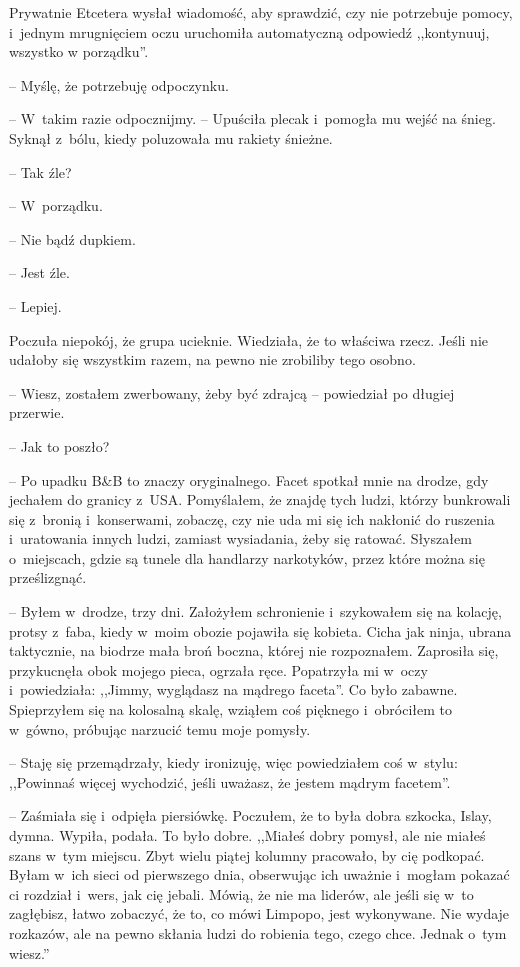 \documentclass[oneside,polish,11pt,sfheadings]{mwbk}
\begin{document}
Prywatnie Etcetera wysłał
wiadomość, aby sprawdzić, czy nie potrzebuje pomocy, i~jednym
mrugnięciem oczu uruchomiła automatyczną odpowiedź ,,kontynuuj, wszystko
w porządku''.

-- Myślę, że potrzebuję odpoczynku.

-- W~takim razie odpocznijmy. -- Upuściła plecak i~pomogła mu wejść na
śnieg. Syknął z~bólu, kiedy poluzowała mu rakiety śnieżne.

-- Tak źle?

-- W~porządku.

-- Nie bądź dupkiem.

-- Jest źle.

-- Lepiej.

Poczuła niepokój, że grupa ucieknie. Wiedziała, że to właściwa rzecz.
Jeśli nie udałoby się wszystkim razem, na pewno nie zrobiliby tego
osobno.

-- Wiesz, zostałem zwerbowany, żeby być zdrajcą -- powiedział po długiej
przerwie.

-- Jak to poszło?

-- Po upadku B\&B to znaczy oryginalnego. Facet spotkał mnie na drodze,
gdy jechałem do granicy z~USA. Pomyślałem, że znajdę tych ludzi, którzy
bunkrowali się z~bronią i~konserwami, zobaczę, czy nie uda mi się ich
nakłonić do ruszenia i~uratowania innych ludzi, zamiast wysiadania, żeby
się ratować. Słyszałem o~miejscach, gdzie są tunele dla handlarzy
narkotyków, przez które można się prześlizgnąć.

-- Byłem w~drodze, trzy dni. Założyłem schronienie i~szykowałem się na
kolację, protsy z~faba, kiedy w~moim obozie pojawiła się kobieta. Cicha
jak ninja, ubrana taktycznie, na biodrze mała broń boczna, której nie
rozpoznałem. Zaprosiła się, przykucnęła obok mojego pieca, ogrzała ręce.
Popatrzyła mi w~oczy i~powiedziała: ,,Jimmy, wyglądasz na mądrego
faceta''. Co było zabawne. Spieprzyłem się na kolosalną skalę, wziąłem
coś pięknego i~obróciłem to w~gówno, próbując narzucić temu moje
pomysły.

-- Staję się przemądrzały, kiedy ironizuję, więc powiedziałem coś w~stylu: ,,Powinnaś więcej wychodzić, jeśli uważasz, że jestem mądrym
facetem''.

-- Zaśmiała się i~odpięła piersiówkę. Poczułem, że to była dobra szkocka,
Islay, dymna. Wypiła, podała. To było dobre. ,,Miałeś dobry pomysł, ale
nie miałeś szans w~tym miejscu. Zbyt wielu piątej kolumny pracowało, by
cię podkopać. Byłam w~ich sieci od pierwszego dnia, obserwując ich
uważnie i~mogłam pokazać ci rozdział i~wers, jak cię jebali. Mówią, że
nie ma liderów, ale jeśli się w~to zagłębisz, łatwo zobaczyć, że to, co
mówi Limpopo, jest wykonywane. Nie wydaje rozkazów, ale na pewno skłania
ludzi do robienia tego, czego chce. Jednak o~tym wiesz.''
\end{document}
